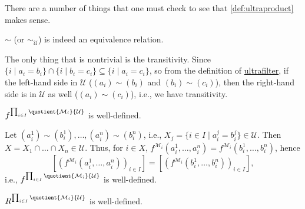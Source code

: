 There are a number of things that one must check to see that \autoref{def:ultraproduct} makes sense.

\begin{claim}
	\(\sim \) (or \(\sim _\mathcal{U} \)) is indeed an equivalence relation.
\end{claim}
\begin{explanation}
	The only thing that is nontrivial is the transitivity. Since \(\{i \mid a_i = b_i\} \cap \{i \mid b_i = c_i\} \subseteq \{i \mid a_i = c_i\}\), so from the definition of \hyperref[def:ultrafilter]{ultrafilter}, if the left-hand side in \(\mathcal{U} \) (\((a_i) \sim (b_i)\) and \((b_i) \sim (c_i)\)), then the right-hand side is in \(\mathcal{U} \) as well (\((a_i) \sim (c_i)\)), i.e., we have transitivity.
\end{explanation}

\begin{claim}
	\(f^{\prod_{i\in I} \quotient{\mathcal{M} _i}{\mathcal{U} } }\) is well-defined.
\end{claim}
\begin{explanation}
	Let \((a_i^1) \sim (b_i^1), \dots , (a_i^n) \sim (b_i^n)\), i.e., \(X_j = \{i \in I \mid a_i^j = b_i^j\} \in \mathcal{U}\). Then \(X = X_1 \cap \dots \cap X_n \in \mathcal{U} \). Thus, for \(i\in X\), \(f^{\mathcal{M} _i}(a_i^1, \dots , a_i^n) = f^{\mathcal{M} _i}(b_i^1, \dots , b_i^n)\), hence
	\[
		[(f^{\mathcal{M} _i}(a_i^1, \dots , a_i^n))_{i\in I}] = [(f^{\mathcal{M} _i}(b_i^1, \dots , b_i^n))_{i\in I}],
	\]
	i.e., \(f^{\prod_{i\in I}^{} \quotient{\mathcal{M} _i}{\mathcal{U} } }\) is well-defined.
\end{explanation}

\begin{note}
	\(R^{\prod_{i\in I} \quotient{\mathcal{M} _i}{\mathcal{U} } }\) is well-defined.
\end{note}